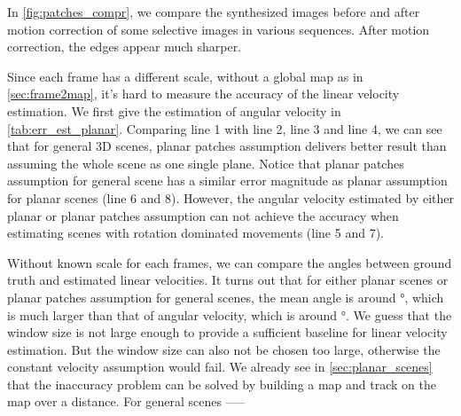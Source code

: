 In \cref{fig:patches_compr}, we compare the synthesized images before
and after motion correction of some selective images in various
sequences. After motion correction, the edges appear much sharper.

Since each frame has a different scale, without a global map as in
\cref{sec:frame2map}, it's hard to measure the accuracy of the linear
velocity estimation. We first give the estimation of angular velocity
in \cref{tab:err_est_planar}. Comparing line 1 with line 2, line 3 and
line 4, we can see that for general 3D scenes, planar patches
assumption delivers better result than assuming the whole scene as one
single plane. Notice that planar patches assumption for general scene
has a similar error magnitude as planar assumption for planar scenes
(line 6 and 8). However, the angular velocity estimated by either
planar or planar patches assumption can not achieve the accuracy when
estimating scenes with rotation dominated movements (line 5 and 7).

Without known scale for each frames, we can compare the angles between
ground truth and estimated linear velocities. It turns out that for
either planar scenes or planar patches assumption for general scenes,
the mean angle is around \unit[50]{\degree}, which is much larger than that
of angular velocity, which is around \unit[20]{\degree}. We guess that the
window size is not large enough to provide a sufficient baseline for
linear velocity estimation. But the window size can also not be chosen
too large, otherwise the constant velocity assumption would fail. We
already see in \cref{sec:planar_scenes} that the inaccuracy problem
can be solved by building a map and track on the map over a
distance. For general scenes -----

